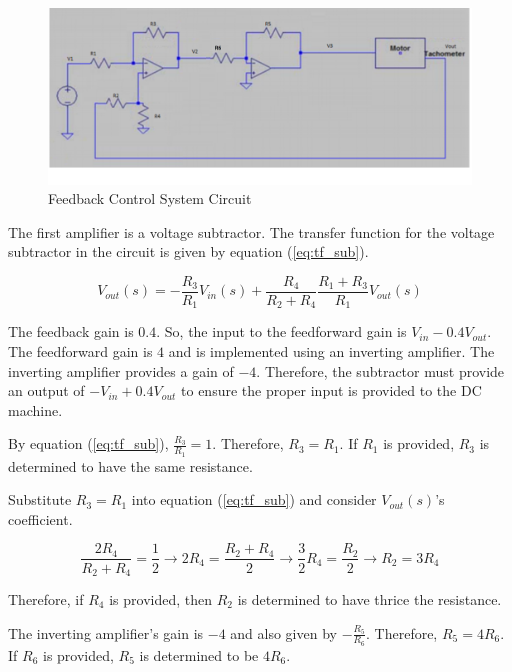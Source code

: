 \FloatBarrier

\begin{figure}[h!]
	\centering
	\includegraphics[scale=0.75]{../images/schem6.PNG}
	\caption{Feedback Control System Circuit}
	\label{fig:schem6}
\end{figure}

\FloatBarrier
The first amplifier is a voltage subtractor.
The transfer function for the voltage subtractor in the circuit is given by equation (\ref{eq:tf_sub}).

\begin{equation}
	\label{eq:tf_sub}
	V_{out}(s) = -\frac{ R_3 }{ R_1 }V_{in}(s) + \frac{ R_4 }{ R_2 + R_4 } \frac{ R_1 + R_3 }{ R_1 } V_{out}(s)
\end{equation}

The feedback gain is $0.4$.
So, the input to the feedforward gain is $V_{in} - 0.4V_{out}$.
The feedforward gain is $4$ and is implemented using an inverting amplifier.
The inverting amplifier provides a gain of $-4$.
Therefore, the subtractor must provide an output of $-V_{in} + 0.4V_{out}$ to ensure the proper input is provided to the DC machine.

By equation (\ref{eq:tf_sub}), $\frac{R_3}{R_1} = 1$.
Therefore, $R_3 = R_1$.
If $R_1$ is provided, $R_3$ is determined to have the same resistance.

Substitute $R_3 = R_1$ into equation (\ref{eq:tf_sub}) and consider $V_{out}(s)$'s coefficient.

\begin{equation}
	\label{eq:solve_for_r2r4}
	\frac{2 R_4}{R_2 + R_4} = \frac{1}{2}
	\rightarrow 2 R_4 = \frac{R_2 + R_4}{2}
	\rightarrow \frac{3}{2} R_4 = \frac{R_2}{2}
	\rightarrow R_2 = 3 R_4
\end{equation}

Therefore, if $R_4$ is provided, then $R_2$ is determined to have thrice the resistance.

The inverting amplifier's gain is $-4$ and also given by $-\frac{R_5}{R_6}$.
Therefore, $R_5 = 4 R_6$.
If $R_6$ is provided, $R_5$ is determined to be $4 R_6$.

